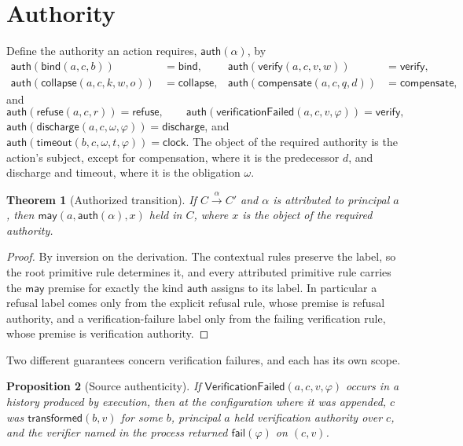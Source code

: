 \documentclass[11pt,openany]{book}
\newtheorem{theorem}{Theorem}[chapter]
\newtheorem{proposition}[theorem]{Proposition}
\theoremstyle{remark}
\begin{document}
\section{Authority}

Define the authority an action requires, $\mathsf{auth}(\alpha)$, by
\[
\begin{aligned}
\mathsf{auth}(\mathsf{bind}(a,c,b))&=\mathsf{bind},&
\mathsf{auth}(\mathsf{verify}(a,c,v,w))&=\mathsf{verify},\\
\mathsf{auth}(\mathsf{collapse}(a,c,k,w,o))&=\mathsf{collapse},&
\mathsf{auth}(\mathsf{compensate}(a,c,q,d))&=\mathsf{compensate},
\end{aligned}
\]
and
\[
\mathsf{auth}(\mathsf{refuse}(a,c,r))=\mathsf{refuse},\qquad
\mathsf{auth}(\mathsf{verificationFailed}(a,c,v,\varphi))=\mathsf{verify},
\]
$\mathsf{auth}(\mathsf{discharge}(a,c,\omega,\varphi))=\mathsf{discharge}$,
and $\mathsf{auth}(\mathsf{timeout}(b,c,\omega,t,\varphi))=\mathsf{clock}$.
The object of the required authority is the action's subject, except for
compensation, where it is the predecessor $d$, and discharge and timeout,
where it is the obligation $\omega$.

\begin{theorem}[Authorized transition]\label{thm:auth}
If $C\xrightarrow{\alpha}C'$ and $\alpha$ is attributed to principal $a$,
then $\mathsf{may}(a,\mathsf{auth}(\alpha),x)$ held in $C$, where $x$ is
the object of the required authority.
\end{theorem}

\begin{proof}
By inversion on the derivation. The contextual rules preserve the label,
so the root primitive rule determines it, and every attributed primitive
rule carries the $\mathsf{may}$ premise for exactly the kind
$\mathsf{auth}$ assigns to its label. In particular a refusal label comes
only from the explicit refusal rule, whose premise is refusal authority,
and a verification-failure label only from the failing verification rule,
whose premise is verification authority.
\end{proof}

Two different guarantees concern verification failures, and each has its
own scope.

\begin{proposition}[Source authenticity]\label{prop:vf}
If $\mathsf{VerificationFailed}(a,c,v,\varphi)$ occurs in a history
produced by execution, then at the configuration where it was appended,
$c$ was $\mathsf{transformed}(b,v)$ for some $b$, principal $a$ held
verification authority over $c$, and the verifier named in the process
returned $\mathsf{fail}(\varphi)$ on $(c,v)$.
\end{proposition}
\end{document}
